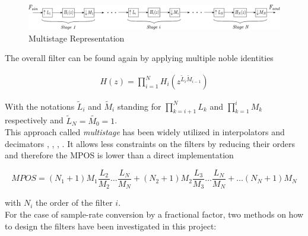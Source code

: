 \begin{figure}[ht!]
	\centering
	\includegraphics[scale = 0.7]{multistage.pdf}
	\caption{Multistage Representation}
	\label{Figure 3.12}
\end{figure}


The overall filter can be found again by applying multiple noble identities

\begin{align}
	H(z) = 	\prod_{i=1}^{N} H_i(z^{\tilde{L}_i \tilde{M}_{i-1}})
	\label{eqn:3.24}
\end{align}

With the notations $\tilde{L}_i$ and $\tilde{M}_{i}$ standing for $\prod_{k=i+1}^{N}L_k$ and $\prod_{k=1}^{i}M_k$ respectively and $\tilde{L}_N = \tilde{M_0} = 1$.\\


This approach called \textit{multistage} has been widely utilized in interpolators and decimators \cite{Proakis}, \cite{Oppenheim}, \cite{vaidyanathan}, \cite{turek}. It allows less constraints on the filters by reducing their orders and therefore the MPOS is lower than a direct implementation

\begin{equation}
	MPOS = (N_1 + 1)M_1 \frac{L_2}{M_2}\dots\frac{L_N}{M_N} + (N_2 + 1)M_2 \frac{L_3}{M_3}\dots \frac{L_N}{M_N} + \dots (N_N + 1)M_N 
	\label{eqn:3.25}
\end{equation}

with $N_i$ the order of the filter $i$.\\

For the case of sample-rate conversion by a fractional factor, two methods on how to design the filters have been investigated in this project:

